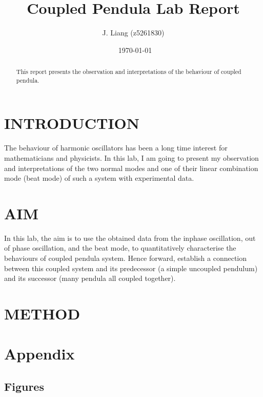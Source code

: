 \documentclass[aps,prl,reprint,10pt,amsmath,amssymb,superscriptaddress,a4paper]{revtex4-2}
\begin{document}
\title{Coupled Pendula Lab Report}
\author{J. Liang (z5261830)}
\date{\currenttime~\today}
\begin{abstract}
    This report presents the observation and interpretations of the behaviour of coupled pendula.
\end{abstract}

\maketitle
\section{INTRODUCTION}
The behaviour of harmonic oscillators has been a long time interest for mathematicians and physicists. In this lab, I am going to present my observation and interpretations of the two normal modes and one of their linear combination mode (beat mode) of such a system with experimental data.

\section{AIM}
In this lab, the aim is to use the obtained data from the inphase oscillation, out of phase oscillation, and the beat mode, to quantitatively characterise the behaviours of coupled pendula system. Hence forward, establish a connection between this coupled system and its predecessor (a simple uncoupled pendulum) and its successor (many pendula all coupled together).

\section{METHOD}






































%
\onecolumngrid
\newpage
\appendix
\section{Appendix}
\subsection{Figures}
\end{document}
